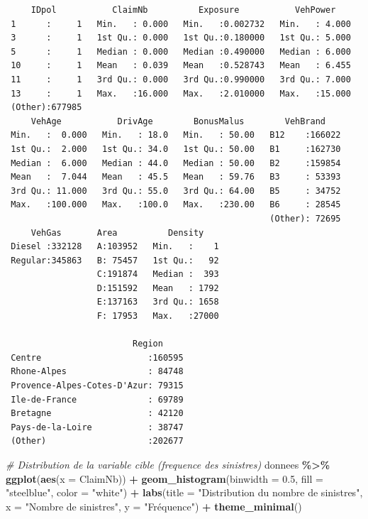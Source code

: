 \documentclass[
  french,
]{book}
\newenvironment{Shaded}{\begin{snugshade}}{\end{snugshade}}
\newcommand{\AttributeTok}[1]{\textcolor[rgb]{0.13,0.29,0.53}{#1}}
\newcommand{\CommentTok}[1]{\textcolor[rgb]{0.56,0.35,0.01}{\textit{#1}}}
\newcommand{\FloatTok}[1]{\textcolor[rgb]{0.00,0.00,0.81}{#1}}
\newcommand{\FunctionTok}[1]{\textcolor[rgb]{0.13,0.29,0.53}{\textbf{#1}}}
\newcommand{\NormalTok}[1]{#1}
\newcommand{\SpecialCharTok}[1]{\textcolor[rgb]{0.81,0.36,0.00}{\textbf{#1}}}
\newcommand{\StringTok}[1]{\textcolor[rgb]{0.31,0.60,0.02}{#1}}
\theoremstyle{definition}
\theoremstyle{definition}
\theoremstyle{definition}
\theoremstyle{definition}
\theoremstyle{remark}
\begin{document}
\begin{verbatim}
     IDpol           ClaimNb          Exposure           VehPower     
 1      :     1   Min.   : 0.000   Min.   :0.002732   Min.   : 4.000  
 3      :     1   1st Qu.: 0.000   1st Qu.:0.180000   1st Qu.: 5.000  
 5      :     1   Median : 0.000   Median :0.490000   Median : 6.000  
 10     :     1   Mean   : 0.039   Mean   :0.528743   Mean   : 6.455  
 11     :     1   3rd Qu.: 0.000   3rd Qu.:0.990000   3rd Qu.: 7.000  
 13     :     1   Max.   :16.000   Max.   :2.010000   Max.   :15.000  
 (Other):677985                                                       
     VehAge           DrivAge        BonusMalus        VehBrand     
 Min.   :  0.000   Min.   : 18.0   Min.   : 50.00   B12    :166022  
 1st Qu.:  2.000   1st Qu.: 34.0   1st Qu.: 50.00   B1     :162730  
 Median :  6.000   Median : 44.0   Median : 50.00   B2     :159854  
 Mean   :  7.044   Mean   : 45.5   Mean   : 59.76   B3     : 53393  
 3rd Qu.: 11.000   3rd Qu.: 55.0   3rd Qu.: 64.00   B5     : 34752  
 Max.   :100.000   Max.   :100.0   Max.   :230.00   B6     : 28545  
                                                    (Other): 72695  
     VehGas       Area          Density     
 Diesel :332128   A:103952   Min.   :    1  
 Regular:345863   B: 75457   1st Qu.:   92  
                  C:191874   Median :  393  
                  D:151592   Mean   : 1792  
                  E:137163   3rd Qu.: 1658  
                  F: 17953   Max.   :27000  
                                            
                         Region      
 Centre                     :160595  
 Rhone-Alpes                : 84748  
 Provence-Alpes-Cotes-D'Azur: 79315  
 Ile-de-France              : 69789  
 Bretagne                   : 42120  
 Pays-de-la-Loire           : 38747  
 (Other)                    :202677  
\end{verbatim}

\begin{Shaded}
\begin{Highlighting}[]
\CommentTok{\# Distribution de la variable cible (frequence des sinistres)}
\NormalTok{donnees }\SpecialCharTok{\%\textgreater{}\%}
  \FunctionTok{ggplot}\NormalTok{(}\FunctionTok{aes}\NormalTok{(}\AttributeTok{x =}\NormalTok{ ClaimNb)) }\SpecialCharTok{+}
  \FunctionTok{geom\_histogram}\NormalTok{(}\AttributeTok{binwidth =} \FloatTok{0.5}\NormalTok{, }\AttributeTok{fill =} \StringTok{"steelblue"}\NormalTok{, }\AttributeTok{color =} \StringTok{"white"}\NormalTok{) }\SpecialCharTok{+}
  \FunctionTok{labs}\NormalTok{(}\AttributeTok{title =} \StringTok{"Distribution du nombre de sinistres"}\NormalTok{,}
       \AttributeTok{x =} \StringTok{"Nombre de sinistres"}\NormalTok{, }\AttributeTok{y =} \StringTok{"Fréquence"}\NormalTok{) }\SpecialCharTok{+}
  \FunctionTok{theme\_minimal}\NormalTok{()}
\end{Highlighting}
\end{Shaded}
\end{document}
